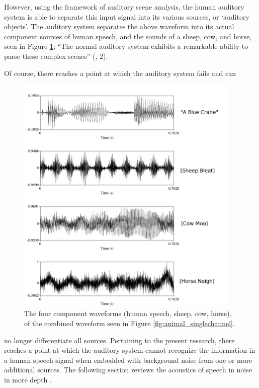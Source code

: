 However, using the framework of auditory scene analysis, the human auditory system is able to separate this input signal into its various sources, or `auditory objects'.  The auditory system separates the above waveform into its actual component sources of human speech, and the sounds of a sheep, cow, and horse, seen in Figure \ref{fig:animal_multichannel}; ``The normal auditory system exhibits a remarkable ability to parse these complex scenes'' (\cite{middlebrooks:17}, 2).

Of course, there reaches a point at which the auditory system fails and can
%
\begin{figure}[h!]
\centering
  \includegraphics[width=0.95\textwidth]{figure/animal_multichannel-w-text.png}
  \caption{The four component waveforms (human speech, sheep, cow, horse), of the combined waveform seen in Figure \ref{fig:animal_singlechannel}.}
  \label{fig:animal_multichannel}
\end{figure}
%
 no longer differentiate all sources. Pertaining to the present research, there reaches a point at which the auditory system cannot recognize the information in a human speech signal when embedded with background noise from one or more additional sources.  The following section reviews the acoustics of speech in noise in more depth .
  
